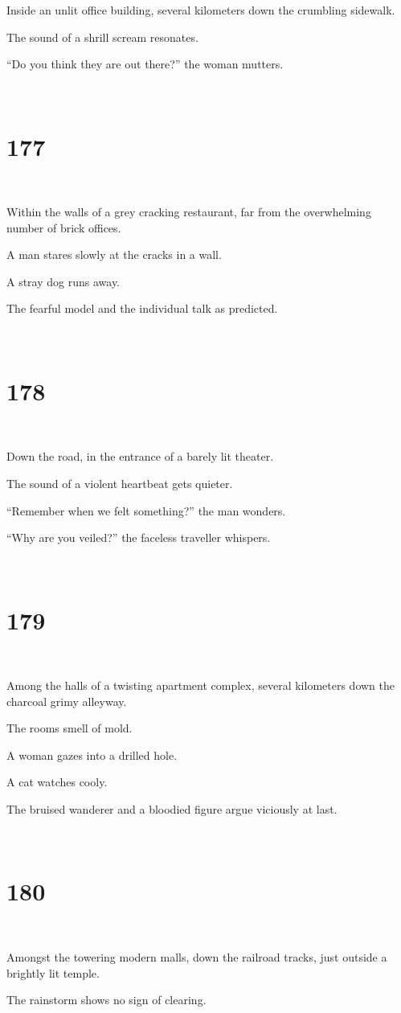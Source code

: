 \documentclass{report}
\begin{document}
Inside an unlit office building, several kilometers down the crumbling sidewalk.

The sound of a shrill scream resonates.

``Do you think they are out there?'' the woman mutters.

~
\chapter*{177}
~

Within the walls of a grey cracking restaurant, far from the overwhelming number of brick offices.

A man stares slowly at the cracks in a wall.

A stray dog runs away.

The fearful model and the individual talk as predicted.

~
\chapter*{178}
~

Down the road, in the entrance of a barely lit theater.

The sound of a violent heartbeat gets quieter.

``Remember when we felt something?'' the man wonders.

``Why are you veiled?'' the faceless traveller whispers.

~
\chapter*{179}
~

Among the halls of a twisting apartment complex, several kilometers down the charcoal grimy alleyway.

The rooms smell of mold.

A woman gazes into a drilled hole.

A cat watches cooly.

The bruised wanderer and a bloodied figure argue viciously at last.

~
\chapter*{180}
~

Amongst the towering modern malls, down the railroad tracks, just outside a brightly lit temple.

The rainstorm shows no sign of clearing.
\end{document}
